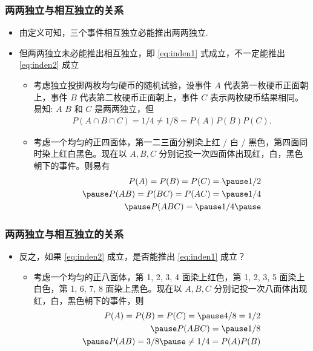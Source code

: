 \documentclass[Prob-All.tex]{subfiles}
\begin{document}
\begin{frame}
	\frametitle{两两独立与相互独立的关系}
	\begin{itemize}[<+-|alert@+>]
		\item 由定义可知，三个事件相互独立必能推出两两独立.
		\item 但两两独立未必能推出相互独立，即 \eqref{eq:inden1} 式成立，不一定能推出 \eqref{eq:inden2} 成立
		\begin{itemize}
			\item 考虑独立投掷两枚均匀硬币的随机试验，设事件 $A$ 代表第一枚硬币正面朝上，事件 $B$ 代表第二枚硬币正面朝上，事件 $C$ 表示两枚硬币结果相同。易知: \pause
			$A$ $B$ 和 $C$ 是两两独立，但
			\begin{align*}
				P(A\cap B\cap C)=1/4\neq 1/8=P(A)P(B)P(C).
			\end{align*}
			\item 考虑一个均匀的正四面体，第一二三面分别染上红 / 白 / 黑色，第四面同时染上红白黑色。现在以 $A,B,C$ 分别记投一次四面体出现红，白，黑色朝下的事件。则易有 \pause
			\begin{eqnarray*}
				P(A)=P(B)=P(C)=\pause 1/2\\ \pause
				P(AB)=P(BC)=P(AC)=\pause 1/4\\ \pause
				P(ABC)=\pause 1/4    \pause
			\end{eqnarray*}
		\end{itemize}\vspace{-0.7cm}
	\end{itemize}
\end{frame}

		\begin{frame}
			\frametitle{两两独立与相互独立的关系}
			\begin{itemize}[<+-|alert@+>]
		\item 反之，如果 \eqref{eq:inden2} 成立，是否能推出 \eqref{eq:inden1} 成立？
		\begin{itemize}[<+-|alert@+>]
			\item 考虑一个均匀的正八面体，第 1, 2, 3, 4 面染上红色，第 1, 2, 3, 5 面染上白色，第 1, 6, 7, 8 面染上黑色。现在以 $A,B,C$ 分别记投一次八面体出现红，白，黑色朝下的事件，则 \pause
			\begin{eqnarray*}
				P(A)=P(B)=P(C)=\pause 4/8=1/2\\ \pause
				P(ABC)=\pause 1/8   \\ \pause
				P(AB)=3/8\pause \neq 1/4=P(A)P(B)
			\end{eqnarray*}
		\end{itemize}
	\end{itemize}
\end{frame}
\end{document}
